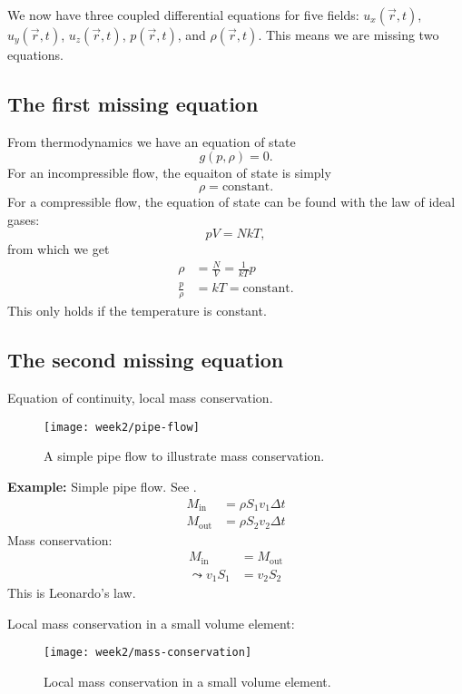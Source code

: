 We now have three coupled differential equations for five fields: $u_x\left(\vec{r},t\right)$, $u_y\left(\vec{r},t\right)$, $u_z\left(\vec{r},t\right)$, $p\left(\vec{r},t\right)$, and $\rho\left(\vec{r},t\right)$. This means we are missing two equations.


\subsection*{The first missing equation}
From thermodynamics we have an equation of state
\begin{equation}
g(p,\rho)=0.
\end{equation}
For an incompressible flow, the equaiton of state is simply
\begin{equation}
\rho = \mathrm{constant}.
\end{equation}
For a compressible flow, the equation of state can be found with the law of ideal gases:
\begin{equation}
pV=NkT,
\end{equation}
from which we get
\begin{align}
\rho &= \frac{N}{V} = \frac{1}{kT}p\\
\frac{p}{\rho} &= kT = \mathrm{constant}.
\end{align}
This only holds if the temperature is constant.


\subsection*{The second missing equation}
Equation of continuity, local mass conservation.

\begin{figure}[!h]
    \centering
    \texttt{[image: week2/pipe-flow]}
    \caption{A simple pipe flow to illustrate mass conservation.}
    \label{fig:pipe-flow}
\end{figure}

\begin{framed}
\textbf{Example:} Simple pipe flow. See .
\begin{align}
M_\mathrm{in} &= \rho S_1v_1\Delta t \\
M_\mathrm{out} &= \rho S_2v_2\Delta t
\end{align}
Mass conservation:
\begin{align}
M_\mathrm{in} &= M_\mathrm{out}\\
\leadsto
v_1S_1 &= v_2S_2
\end{align}
This is Leonardo's law.
\end{framed}
Local mass conservation in a small volume element:
\begin{figure}[!h]
    \centering
    \texttt{[image: week2/mass-conservation]}
    \caption{Local mass conservation in a small volume element.}
    \label{fig:mass-conservation}
\end{figure}

